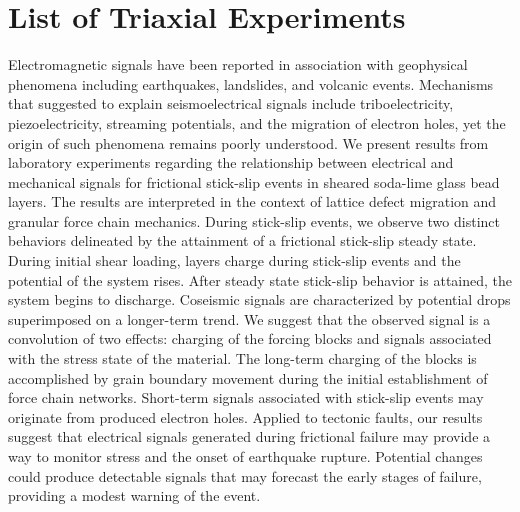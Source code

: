 \chapter{List of Triaxial Experiments}
Electromagnetic signals have been reported in association with geophysical phenomena including earthquakes, landslides, and volcanic events. Mechanisms that suggested to explain seismoelectrical signals include triboelectricity, piezoelectricity, streaming potentials, and the migration
of electron holes, yet the origin of such phenomena remains poorly understood. We present results from laboratory experiments regarding the relationship between electrical and mechanical signals for frictional stick-slip events in sheared soda-lime glass bead layers. The results are interpreted in the context of lattice defect migration and granular force chain mechanics. During stick-slip events, we observe two distinct behaviors delineated by the attainment of a frictional stick-slip steady state. During initial shear loading, layers charge during stick-slip events and the potential of the system rises. After steady state stick-slip behavior is attained, the system begins to discharge. Coseismic signals are characterized by potential drops superimposed on a longer-term trend. We suggest that the observed signal is a convolution of two effects: charging of the forcing blocks and signals associated with the stress state of the material. The long-term charging of the blocks is accomplished by grain boundary movement during the initial establishment of force chain networks. Short-term signals associated with stick-slip events may originate from produced electron holes. Applied to tectonic faults, our results suggest that electrical signals generated during frictional failure may provide a way to monitor stress and the onset of earthquake rupture. Potential changes could produce detectable signals that may forecast the early stages of failure, providing a modest warning of the event.
